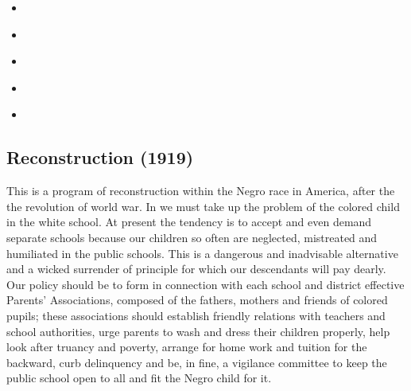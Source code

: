 \documentclass[letterpaper,10pt,english]{jupyterBook}
\begin{document}
\begin{itemize}
\item {} 
\sphinxAtStartPar
{\hyperref[\detokenize{Volumes/40/10/church_and_religion::doc}]{}}

\item {} 
\sphinxAtStartPar
{\hyperref[\detokenize{Volumes/40/11/panafrica_and_new_racial_philosophy::doc}]{}}

\item {} 
\sphinxAtStartPar
{\hyperref[\detokenize{Volumes/40/12/matter_of_manners::doc}]{}}

\item {} 
\sphinxAtStartPar
{\hyperref[\detokenize{Volumes/40/12/peace::doc}]{}}

\item {} 
\sphinxAtStartPar
{\hyperref[\detokenize{Volumes/41/01/scottsboro::doc}]{}}

\end{itemize}


\subsection{Reconstruction (1919)}
\label{\detokenize{Volumes/18/03/reconstruction:reconstruction-1919}}\label{\detokenize{Volumes/18/03/reconstruction::doc}}
\sphinxAtStartPar
This is a program of reconstruction within the Negro race in America, after the the revolution of world war. In  we must take up the problem of the colored child in the white school. At present the tendency is to accept and even demand separate schools because our children so often are neglected, mistreated and humiliated in the public schools. This is a dangerous and inadvisable alternative and a wicked surrender of principle for which our descendants will pay dearly. Our policy should be to form in connection with each school and district effective Parents’ Associations, composed of the fathers, mothers and friends of colored pupils; these associations should establish friendly relations with teachers and school authorities, urge parents to wash and dress their children properly, help look after truancy and poverty, arrange for home work and tuition for the backward, curb delinquency and be, in fine, a vigilance committee to keep the public school open to all and fit the Negro child for it.
\end{document}
